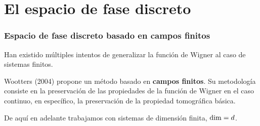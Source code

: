 \documentclass[10pt, spanish]{beamer}
\let\H\relax
\DeclareMathOperator{\H}{\mathcal H}
\begin{document}







  \section{El espacio de fase discreto}

  \begin{frame}
    \frametitle{Espacio de fase discreto basado en campos
    finitos}

    Han existido múltiples intentos de generalizar la
    función de Wigner al caso de sistemas finitos.

    \vspace{15pt}

    Wootters (2004) propone un método basado en
    \textbf{campos finitos}. Su metodología consiste en la
    preservación de las propiedades de la función de Wigner
    en el caso continuo, en específico, la preservación de
    la propiedad tomográfica básica.

    \vspace{15pt}

    De aquí en adelante trabajamos con sistemas de dimensión
    finita, $\dim \H = d$.
  \end{frame}
\end{document}

